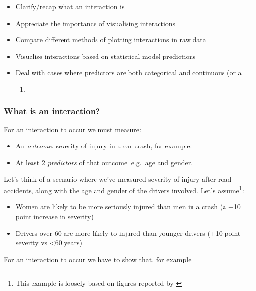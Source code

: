 \documentclass[]{article}
\providecommand{\tightlist}{%
  \setlength{\itemsep}{0pt}\setlength{\parskip}{0pt}}
\let\rmarkdownfootnote\footnote%
\def\footnote{\protect\rmarkdownfootnote}
\begin{document}
\begin{itemize}
\item
  Clarify/recap what an interaction is
\item
  Appreciate the importance of visualising interactions
\item
  Compare different methods of plotting interactions in raw data
\item
  Visualise interactions based on statistical model predictions
\item
  Deal with cases where predictors are both categorical and continuous (or a

  \begin{enumerate}
  \def\labelenumi{\roman{enumi})}
  \setcounter{enumi}{1008}
  \item
  \end{enumerate}
\end{itemize}

\hypertarget{what-is-an-interaction}{%
\subsubsection*{What is an interaction?}\label{what-is-an-interaction}}

For an interaction to occur we must measure:

\begin{itemize}
\tightlist
\item
  An \emph{outcome}: severity of injury in a car crash, for example.
\item
  At least 2 \emph{predictors} of that outcome: e.g.~age and gender.
\end{itemize}

Let's think of a scenario where we've measured severity of injury after road
accidents, along with the age and gender of the drivers involved. Let's
assume\footnote{This example is loosely based on figures reported by
  \citet{kockelman2002driver}}:

\begin{itemize}
\tightlist
\item
  Women are likely to be more seriously injured than men in a crash (a +10
  point increase in severity)
\item
  Drivers over 60 are more likely to injured than younger drivers (+10 point
  severity vs \textless{}60 years)
\end{itemize}

For an interaction to occur we have to show that, for example:
\end{document}
